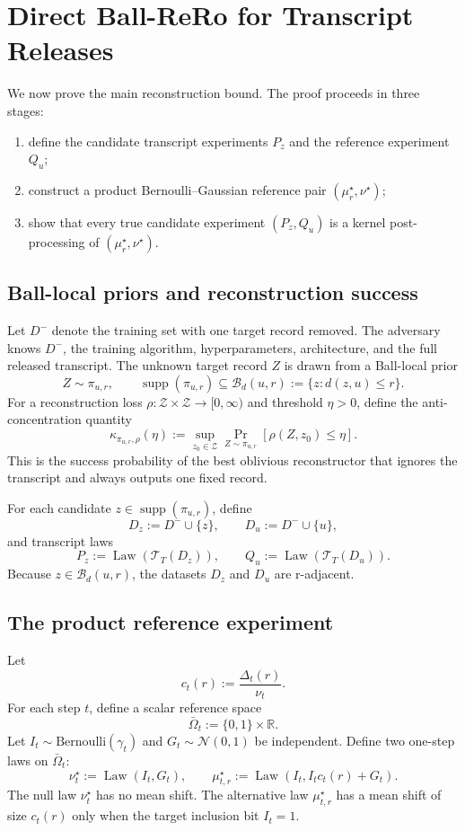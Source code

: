 \documentclass[conference,compsoc]{IEEEtran}
\DeclareMathOperator{\Law}{Law}
\DeclareMathOperator{\supp}{supp}
\newcommand{\R}{\mathbb{R}}
\newcommand{\N}{\mathcal{N}}
\newcommand{\cT}{\mathcal{T}}
\newcommand{\cZ}{\mathcal{Z}}
\newcommand{\cB}{\mathcal{B}}
\begin{document}
\section{Direct Ball-ReRo for Transcript Releases}
\label{sec:direct-rero}

We now prove the main reconstruction bound. The proof proceeds in three stages:
\begin{enumerate}[leftmargin=1.4em]
    \item define the candidate transcript experiments $P_z$ and the reference experiment $Q_u$;
    \item construct a product Bernoulli--Gaussian reference pair $(\mu_r^\star,\nu^\star)$;
    \item show that every true candidate experiment $(P_z,Q_u)$ is a kernel post-processing of $(\mu_r^\star,\nu^\star)$.
\end{enumerate}

\subsection{Ball-local priors and reconstruction success}

Let $D^-$ denote the training set with one target record removed. The adversary knows $D^-$, the training algorithm, hyperparameters, architecture, and the full released transcript. The unknown target record $Z$ is drawn from a Ball-local prior
\[
Z\sim\pi_{u,r},
\qquad
\supp(\pi_{u,r})\subseteq\cB_d(u,r):=\{z:d(z,u)\le r\}.
\]
For a reconstruction loss $\rho:\cZ\times\cZ\to[0,\infty)$ and threshold $\eta>0$, define the anti-concentration quantity
\[
\kappa_{\pi_{u,r},\rho}(\eta)
:=
\sup_{z_0\in\cZ}
\Pr_{Z\sim\pi_{u,r}}[\rho(Z,z_0)\le\eta].
\]
This is the success probability of the best oblivious reconstructor that ignores the transcript and always outputs one fixed record.

For each candidate $z\in\supp(\pi_{u,r})$, define
\[
D_z:=D^-\cup\{z\},
\qquad
D_u:=D^-\cup\{u\},
\]
and transcript laws
\[
P_z:=\Law(\cT_T(D_z)),
\qquad
Q_u:=\Law(\cT_T(D_u)).
\]
Because $z\in\cB_d(u,r)$, the datasets $D_z$ and $D_u$ are r-adjacent.

\subsection{The product reference experiment}

Let
\[
c_t(r):=\frac{\Delta_t(r)}{\nu_t}.
\]
For each step $t$, define a scalar reference space
\[
\bar\Omega_t:=\{0,1\}\times\R.
\]
Let $I_t\sim\mathrm{Bernoulli}(\gamma_t)$ and $G_t\sim\N(0,1)$ be independent. Define two one-step laws on $\bar\Omega_t$:
\[
\nu_t^\star:=\Law(I_t,G_t),
\qquad
\mu_{t,r}^\star:=\Law(I_t,I_t c_t(r)+G_t).
\]
The null law $\nu_t^\star$ has no mean shift. The alternative law $\mu_{t,r}^\star$ has a mean shift of size $c_t(r)$ only when the target inclusion bit $I_t=1$.
\end{document}

